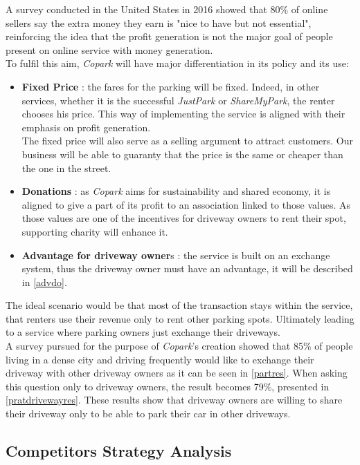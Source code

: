 \documentclass[12pt,a4paper,oneside]{book}
\newcommand{\bp}{\textit{Copark}}
\begin{document}
A survey conducted in the United States in 2016 showed that 80\% of online sellers say the extra money they earn is "nice to have but not essential", reinforcing the idea that the profit generation is not the major goal of people present on online service with money generation.\cite{ospg}\\

To fulfil this aim, \bp{} will have major differentiation in its policy and its use:
\begin{itemize}
\item \textbf{Fixed Price} : the fares for the parking will be fixed. Indeed, in other services, whether it is  the successful \textit{JustPark} or \textit{ShareMyPark}, the renter chooses his price. This way of implementing the service is aligned with their emphasis on profit generation.\\
The fixed price will also serve as a selling argument to attract customers. Our business will be able to guaranty that the price is the same or cheaper than the one in the street.
\item \textbf{Donations} : as \bp{} aims for sustainability and shared economy, it is aligned to give a part of its profit to an association linked to those values. As those values are one of the incentives for driveway owners to rent their spot, supporting charity will enhance it.
\item \textbf{Advantage for driveway owner}s : the service is built on an exchange system, thus the driveway owner must have an advantage, it will be described in \autoref{advdo}.
\end{itemize}

The ideal scenario would be that most of the transaction stays within the service, that renters use their revenue only to rent other parking spots. Ultimately leading to a service where parking owners just exchange their driveways.\\

A survey pursued for the purpose of \bp{}'s creation showed that 85\% of people living in a dense city and driving frequently would like to exchange their driveway with other driveway owners as it can be seen in \autoref{partres}. When asking this question only to driveway owners, the result becomes 79\%, presented in \autoref{pratdrivewayres}. These results show that driveway owners are willing to share their driveway only to be able to park their car in other driveways.

\subsection{Competitors Strategy Analysis}
\label{compsa}
\end{document}
